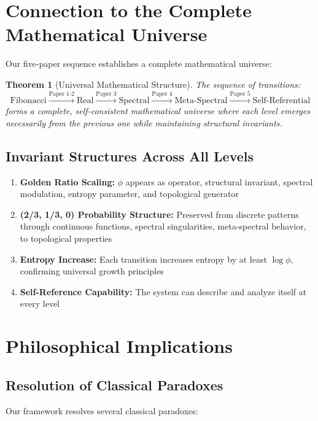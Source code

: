 \documentclass[12pt]{article}
\theoremstyle{plain}
\newtheorem{theorem}{Theorem}[section]
\theoremstyle{definition}
\begin{document}
\section{Connection to the Complete Mathematical Universe}

Our five-paper sequence establishes a complete mathematical universe:

\begin{theorem}[Universal Mathematical Structure]
The sequence of transitions:
$$\text{Fibonacci} \xrightarrow{\text{Paper 1-2}} \text{Real} \xrightarrow{\text{Paper 3}} \text{Spectral} \xrightarrow{\text{Paper 4}} \text{Meta-Spectral} \xrightarrow{\text{Paper 5}} \text{Self-Referential}$$
forms a complete, self-consistent mathematical universe where each level emerges necessarily from the previous one while maintaining structural invariants.
\end{theorem}

\subsection{Invariant Structures Across All Levels}

\begin{enumerate}
\item \textbf{Golden Ratio Scaling:} $\phi$ appears as operator, structural invariant, spectral modulation, entropy parameter, and topological generator
\item \textbf{(2/3, 1/3, 0) Probability Structure:} Preserved from discrete patterns through continuous functions, spectral singularities, meta-spectral behavior, to topological properties
\item \textbf{Entropy Increase:} Each transition increases entropy by at least $\log \phi$, confirming universal growth principles
\item \textbf{Self-Reference Capability:} The system can describe and analyze itself at every level
\end{enumerate}

\section{Philosophical Implications}

\subsection{Resolution of Classical Paradoxes}

Our framework resolves several classical paradoxes:
\end{document}
